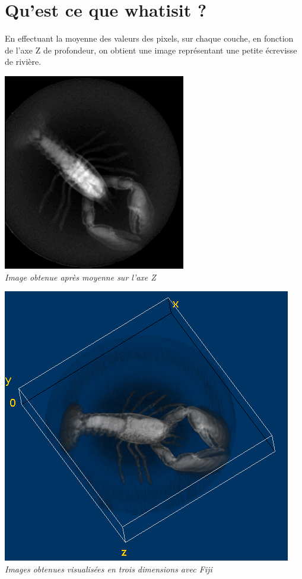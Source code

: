 \documentclass[a4paper,11pt]{article}
\begin{document}
\newpage 
\section{Qu'est ce que whatisit ?}
En effectuant la moyenne des valeurs des pixels, sur chaque couche, en fonction de l'axe Z de profondeur, on obtient une image représentant une petite écrevisse de rivière.
\begin{center}
\includegraphics[scale=0.7]{ecrevisse.png}\\
\textit{Image obtenue après moyenne sur l'axe Z}
\end{center}
\begin{center}
\includegraphics[scale=0.5]{ecrevisse3Dfiji.png}\\
\textit{Images obtenues visualisées en trois dimensions avec Fiji}
\end{center}
\end{document}

